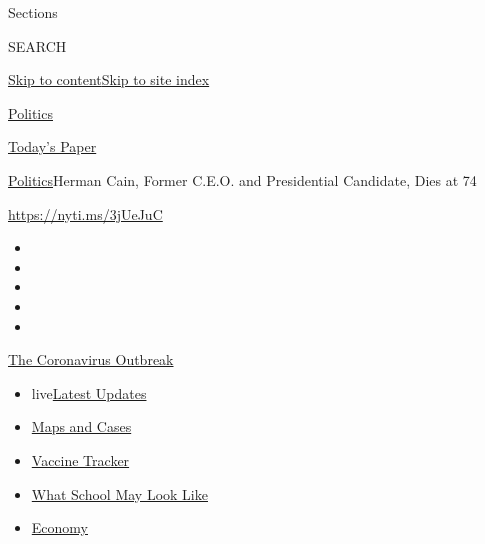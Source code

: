 Sections

SEARCH

\protect\hyperlink{site-content}{Skip to
content}\protect\hyperlink{site-index}{Skip to site index}

\href{https://www.nytimes.com/section/politics}{Politics}

\href{https://myaccount.nytimes.com/auth/login?response_type=cookie\&client_id=vi}{}

\href{https://www.nytimes.com/section/todayspaper}{Today's Paper}

\href{/section/politics}{Politics}\textbar{}Herman Cain, Former C.E.O.
and Presidential Candidate, Dies at 74

\url{https://nyti.ms/3jUeJuC}

\begin{itemize}
\item
\item
\item
\item
\item
\end{itemize}

\href{https://www.nytimes.com/news-event/coronavirus?action=click\&pgtype=Article\&state=default\&region=TOP_BANNER\&context=storylines_menu}{The
Coronavirus Outbreak}

\begin{itemize}
\tightlist
\item
  live\href{https://www.nytimes.com/2020/08/01/world/coronavirus-covid-19.html?action=click\&pgtype=Article\&state=default\&region=TOP_BANNER\&context=storylines_menu}{Latest
  Updates}
\item
  \href{https://www.nytimes.com/interactive/2020/us/coronavirus-us-cases.html?action=click\&pgtype=Article\&state=default\&region=TOP_BANNER\&context=storylines_menu}{Maps
  and Cases}
\item
  \href{https://www.nytimes.com/interactive/2020/science/coronavirus-vaccine-tracker.html?action=click\&pgtype=Article\&state=default\&region=TOP_BANNER\&context=storylines_menu}{Vaccine
  Tracker}
\item
  \href{https://www.nytimes.com/interactive/2020/07/29/us/schools-reopening-coronavirus.html?action=click\&pgtype=Article\&state=default\&region=TOP_BANNER\&context=storylines_menu}{What
  School May Look Like}
\item
  \href{https://www.nytimes.com/live/2020/07/31/business/stock-market-today-coronavirus?action=click\&pgtype=Article\&state=default\&region=TOP_BANNER\&context=storylines_menu}{Economy}
\end{itemize}

